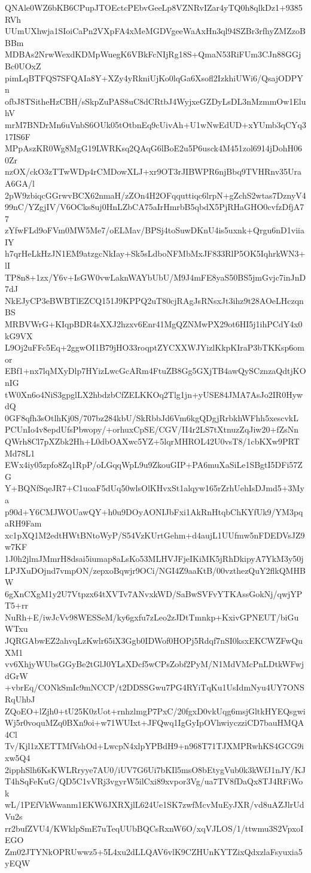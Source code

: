 QNAle0WZ6bKB6CPupJTOEctcPEbvGeeLp8VZNRvIZar4yTQ0h8qlkDz1+9385RVh
UUmUXhwja1SIoiCaPn2VXpFA4xMeMGDVgeeWaAxHn3ql94SZBr3rfhyZMZzoBBBm
MDBAs2NrwWexdKDMpWuegK6VBkFcNIjRg18S+QmaN53RiFUm3CJn88GGjBc0UOxZ
pimLqBTFQS7SFQAIa8Y+XZy4yRkniUjKo0lqGa6Xsofl2IzkhiUWi6/QsajODPYn
ofbJ8TSitheHzCBH/sSkpZuPAS8uC8dCRtbJ4WyjxeGZDyLsDL3nMzmmOw1EluhV
mrM7BNDrMn6uVnbS6OUk05tOtbnEq9cUivAh+U1wNwEdUD+xYUmb3qCYq317IS6F
MPpAszKR0Wg8MgG19LWRKsq2QAqG6lBoE2u5P6usck4M451zol6914jDohH060Zr
nzOX/ckO3zTTwWDp4rCMDowXLJ+xr9OT3rJIBWPR6njBbq9TVHRnv35UraA6GA/l
2pW9zbiqcGGrwvBCX62nmaH/zZOn4H2OFqquttiqc6lrpN+gZchS2wtas7DznyV4
99nC/YZgjIV/V6OCks8uj0HnLZbCA75aIrHmrbB5qbdX5PjRHaGHO0cvfzDfjA77
zYfwFLd9oFVm0MW5Me7/oELMav/BPSj4toSuwDKnU4is5uxnk+Qrgu6nD1viiaIY
h7qrHeLkHzJN1EM9atzgcNkIay+Sk5sLdboNFMbMxJF833RlP5OK5IqhrkWN3+lI
TP8n8+1zx/Y6v+IsGW0vwLaknWAYbUbU/M9J4mFE8yaS50BS5jmGvjc7inJnD7dJ
NkEJyCP3eBWBTlEZCQ151J9KPPQ2uT80cjRAgJsRNsxJt3ihz9t28AOeLHczqnBS
MRBVWrG+KIqpBDR4sXXJ2hzxv6Enr41MgQZNMwPX29ot6HI5j1ihPCdY4x0kG9VX
L9Oj2uFFc5Eq+2ggwOI1B79jHO33roqptZYCXXWJYizlKkpKIraP3bTKKsp6omor
EBf1+nx7lqMXyDlp7HYizLwcGcARm4FtuZB8Gg5GXjTB4awQySCznzaQdtjKOnIG
tW0Xn6o4NiS3gpglLX2hbdzbCfZELKKOq2Tlg1jn+yUSE84JMA7AsJo2IR0HywdQ
0GF8qfh3sOtlhKj0S/707bz284kbU/SkRbbJd6Vm6kgQDgjRrbkhWFhh5xescvkL
PCUnIo4v8epdUfsPbwopy/+orhuxCpSE/CGV/II4r2LS7tXtnuzZqJiw20+fZsNn
QWrh8Cl7pXZbk2Hh+L0dbOAXwc5YZ+5lqrMHROL42U0vsT8/1cbKXw9PRTMd78L1
EWx4iy05zpfo8Zq1RpP/oLGqqWpL9u9ZkouGIP+PA6muXaSiLe1SBgtI5DFi57ZG
Y+BQNfSqeJR7+C1uoaF5dUq50wlsOlKHvxSt1alqyw165rZrhUehIsDJmd5+3Mya
p90d+Y6CMJWOUawQY+h0u9DOyAONIJbFxi1AkRnHtqbChKYfUk9/YM3pqaRH9Fam
xc1pXQ1M2edtHWtBNtoWyP/S54VzKUrtGehm+d4aujL1UUfmw5nFDEDVsJZ9w7KF
1J0h2jlmJMmrH8dsai5iumap8aLsKo53MLHVJFjeIKiMK5jRhDkipyA7YkM3y50j
LPJXuDOjnd7vmpON/zepxoBqwjr9OCi/NGI4Z9aaKtB/00vzthezQuY2flkQMHBW
6gXnCXgM1y2U7Vtpzx64tXVTv7ANvxkWD/SaBwSVFvYTKAssGokNj/qwjYPT5+rr
NuRh+E/iwJcVv98WESSeM/ky6gxfu7zLeo2zJDtTmnkp+KxivGPNEUT/biGuWTxu
JQRGAbwEZ2ahvqLzKwlr65iX3Ggb0IDWof0HOPj5Rdqf7nSI0ksxEKCWZFwQuXM1
vv6XhjyWUbsGGyBe2tGlJ0YLsXDcf5wCPsZobf2PyM/N1MdVMcPnLDtkWFwjdGrW
+vbrEq/CONkSmIc9mNCCP/t2DDSSGwu7PG4RYiTqKu1UsIdmNyu4UY7ONSRqUhbJ
ZQoEO+lZjh0+tU25K0zUot+rnhzlmgP7PxC/20fgxD0vkUqg6msjGltkHYEQsgwi
Wj5r0voquMZq0BXn9oi+w71WUIxt+JFQwq1IgGyIpOVhwiyczziCD7bauHMQA4Cl
Tv/Kjl1zXETTMfVshOd+LwcpN4xlpYPBdH9+n968T71TJXMPRwhKS4GCG9ixw5Q4
2ipphSlh6KsKWLRryye7AU0/iUV7G6Ui7bKIl5msO8bEtygVub0k3kWfJ1nJY/KJ
T4hSqFeKuG/QD5C1vVRj3vgyrW5ilCxi89xvpor3Vg/ua7TV8fDaQx8TJ4RFiWok
wL/1PEfVkWwanm1EKW6JXRXjlL624Ue1SK7zwfMcvMuEyJXR/vd8uAZJlrUdVu2s
rr2bufZVU4/KWklpSmE7uTeqUUbBQCsRxnW6O/xqVJLOS/1/ttwmu3S2VpxoIEGO
Zm02JTYNkOPRUwwz5+5L4xu2dLLQAV6vlK9CZHUnKYTZixQdxzlaFsyuxia5yEQW
